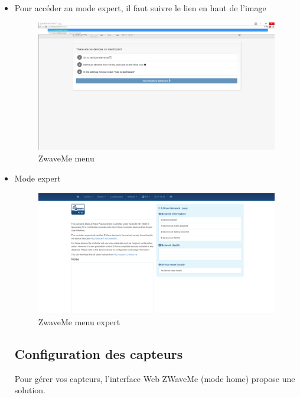 \begin{itemize}
\item  Pour accéder au mode expert, il faut suivre le lien en haut de l'image

\begin{figure}[h]
	\center
	\includegraphics[scale=0.4]{./Images/png/go_to_zwaveme.png}
	\caption{ZwaveMe menu}
\end{figure}
\clearpage

\item Mode expert

\begin{figure}[h]
	\center
	\includegraphics[scale=0.4]{./Images/png/expert_zwaveme.png}
	\caption{ZwaveMe menu expert}
\end{figure}
\clearpage

\subsection{Configuration des capteurs}
Pour gérer vos capteurs, l'interface Web ZWaveMe (mode home) propose une solution.


\end{itemize}

